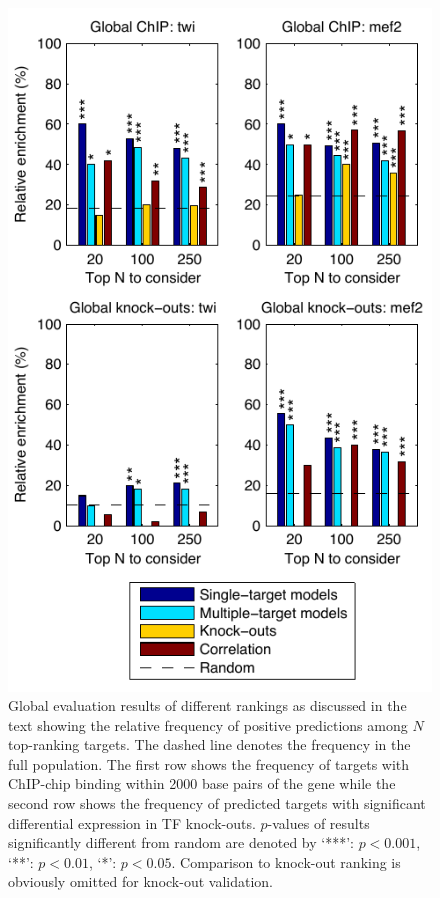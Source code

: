 \documentclass{pnastwo}
\begin{document}
\begin{article}
\begin{figure}[tb]
  \centering
  \includegraphics{dros_global_evaluation}
  \caption{Global evaluation results of different rankings as
    discussed in the text showing the relative frequency of positive
    predictions among $N$ top-ranking targets.
    The dashed line
    denotes the frequency in the full population.
    The first row shows the frequency of targets with ChIP-chip
    binding within 2000 base pairs of the gene
    while the second row shows the frequency of
    predicted targets with significant differential
    expression in TF knock-outs.
    $p$-values of results significantly different from random are
    denoted by `***': $p <
    0.001$, `**': $p < 0.01$, `*': $p < 0.05$.
    Comparison to knock-out ranking is obviously omitted for knock-out
    validation. \label{fig:dros_global_evaluation}
  }
\end{figure}


\end{article}
\end{document}
